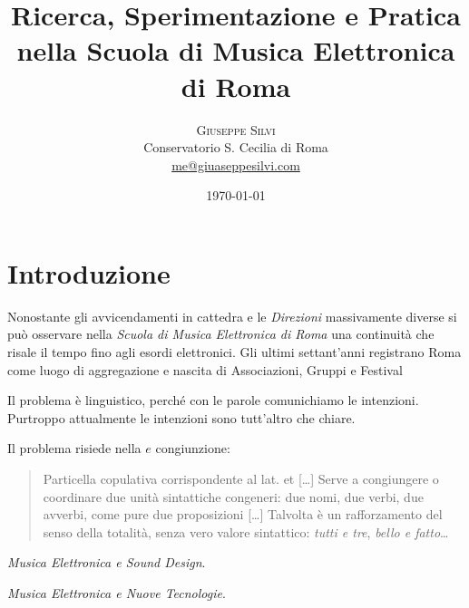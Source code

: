 \documentclass[
	10pt,
	a4paper,
	twocolumn
	]{article}
\title{Ricerca, Sperimentazione e Pratica \\ nella Scuola di Musica Elettronica di Roma} %
\author{%
\textsc{Giuseppe Silvi}\\[1ex]%
\normalsize Conservatorio S. Cecilia di Roma \\ %
\normalsize \href{mailto:me@giuseppesilvi.com}{me@giuaseppesilvi.com} %
}
\date{\today} %
\begin{document}
\maketitle




\section{Introduzione}

Nonostante gli avvicendamenti in cattedra e le \emph{Direzioni} massivamente diverse si può osservare nella \emph{Scuola di Musica Elettronica di Roma} una continuità che risale il tempo fino agli esordi elettronici. Gli ultimi settant'anni registrano Roma come luogo di aggregazione e nascita di Associazioni, Gruppi e Festival 

Il problema è linguistico, perché con le parole comunichiamo le intenzioni. Purtroppo attualmente le intenzioni sono tutt'altro che chiare.

Il problema risiede nella $ e $ congiunzione: 

\begin{quote}
Particella copulativa corrispondente al lat. et [\ldots] Serve a congiungere o coordinare due unità sintattiche congeneri: due nomi, due verbi, due avverbi, come pure due proposizioni [\ldots] Talvolta è un rafforzamento del senso della totalità, senza vero valore sintattico: \emph{tutti e tre}, \emph{bello e fatto}\ldots
\end{quote}

\emph{Musica Elettronica e Sound Design}. 

\emph{Musica Elettronica e Nuove Tecnologie}. 
\end{document}
